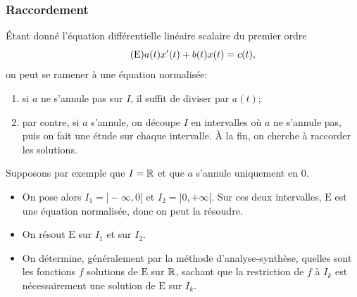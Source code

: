 \documentclass{book}
\begin{document}
\subsubsection{Raccordement}

Étant donné l'équation différentielle linéaire scalaire du premier ordre
\[\tag{$\mathrm{E}$} a(t) x'(t) + b(t) x(t) = c(t),\]
on peut se ramener à une équation normalisée:
\begin{enumerate}
\item si $a$ ne s'annule pas sur $I$, il suffit de diviser par $a(t)$;
\item par contre, si $a$ s'annule, on découpe $I$ en intervalles
  où $a$ ne s'annule pas, puis on fait une étude sur chaque intervalle.
  À la fin, on cherche à \og{}raccorder\fg{} les solutions.
\end{enumerate}
Supposons par exemple que $I=\mathbb{R}    $ et que $a$ s'annule uniquement en $0$.
\begin{itemize}
\item On pose alors $I_1 = ]-\infty,0[$ et $I_2 = ]0,+\infty[$.
  Sur ces deux intervalles, $\mathrm{E}$ est une équation normalisée, donc
  on peut la résoudre.
\item On résout $\mathrm{E}$ sur $I_1$ et sur $I_2$.
\item On détermine, généralement par la méthode d'analyse-synthèse,
  quelles sont les fonctions $f$
  solutions de $\mathrm{E}$ sur $\mathbb{R} $, sachant que la restriction de $f$ à $I_k$
  est nécessairement une solution de $\mathrm{E}$ sur $I_k$.
\end{itemize}
\end{document}
